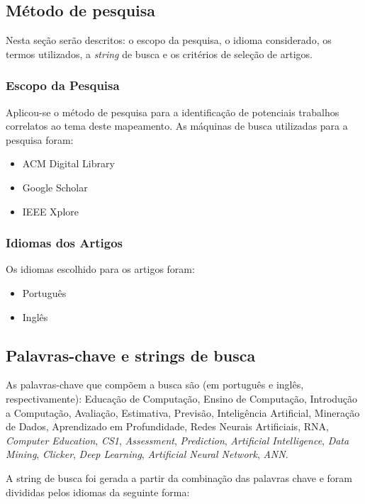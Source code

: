 \documentclass[
	12pt,				%
	openright,			%
	oneside,
	a4paper,			%
	english,			%
	french,				%
	spanish,			%
	brazil,				%
	]{abntex2}
\begin{document}
\subsection{Método de pesquisa}
\label{sec:MP}
Nesta seção serão descritos: o escopo da pesquisa, o idioma considerado, os termos utilizados, a \textit{string} de busca e os critérios de seleção de artigos.

\subsubsection{Escopo da Pesquisa}
Aplicou-se o método de pesquisa para a identificação de potenciais trabalhos correlatos ao tema deste mapeamento. As máquinas de busca utilizadas para a pesquisa foram:
\begin{itemize}
    \item ACM Digital Library
    \item Google Scholar
    \item IEEE Xplore
\end{itemize}

\subsubsection{Idiomas dos Artigos}
Os idiomas escolhido para os artigos foram:

\begin{itemize}
    \item Português
    \item Inglês
\end{itemize}

\subsection{Palavras-chave e strings de busca}
As palavras-chave que compõem a busca são (em português e inglês, respectivamente): 
Educação de Computação, Ensino de Computação, Introdução a Computação, Avaliação, Estimativa, Previsão, Inteligência Artificial, Mineração de Dados, Aprendizado em Profundidade, Redes Neurais Artificiais, RNA, \textit{Computer Education}, \textit{CS1}, \textit{Assessment}, \textit{Prediction}, \textit{Artificial Intelligence}, \textit{Data Mining}, \textit{Clicker}, \textit{Deep Learning}, \textit{Artificial Neural Network}, \textit{ANN}.

A string de busca foi gerada a partir da combinação das palavras chave e foram divididas pelos idiomas da seguinte forma: 
\end{document}
